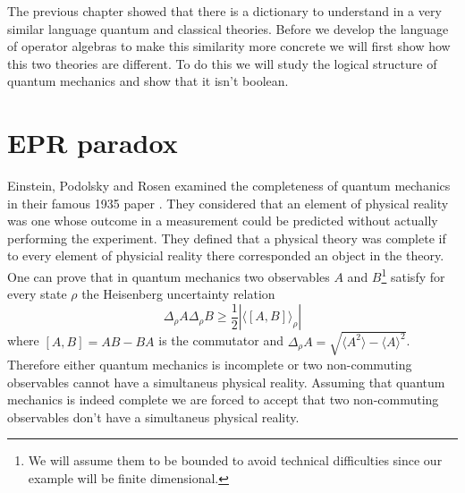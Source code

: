 The previous chapter showed that there is a dictionary to understand in a very similar language quantum and classical theories. Before we develop the language of operator algebras to make this similarity more concrete we will first show how this two theories are different. To do this we will study the logical structure of quantum mechanics and show that it isn't boolean.

\section{EPR paradox}

Einstein, Podolsky and Rosen examined the completeness of quantum mechanics in their famous 1935 paper \cite{Einstein1935}. They considered that an element of physical reality was one whose outcome in a measurement could be predicted without actually performing the experiment. They defined that a physical theory was complete if to every element of physicial reality there corresponded an object in the theory. One can prove that in quantum mechanics two observables $A$ and $B$\footnote{We will assume them to be bounded to avoid technical difficulties since our example will be finite dimensional.} satisfy for every state $\rho$ the Heisenberg uncertainty relation
\begin{equation}
\Delta_\rho A\Delta_\rho B\geq\frac{1}{2}|\langle\left[A,B\right]\rangle_\rho|
\end{equation}
where $\left[A,B\right]=AB-BA$ is the commutator and $\Delta_\rho A=\sqrt{\langle A^2\rangle-\langle A\rangle^2}$. Therefore either quantum mechanics is incomplete or two non-commuting observables cannot have a simultaneus physical reality. Assuming that quantum mechanics is indeed complete we are forced to accept that two non-commuting observables don't have a simultaneus physical reality.

